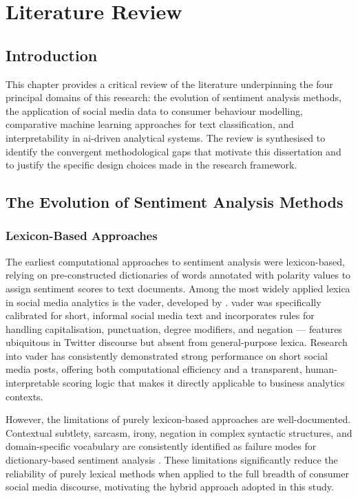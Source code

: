 \chapter{Literature Review}
\label{ch:lit}

\section{Introduction}

This chapter provides a critical review of the literature underpinning the four principal domains of this research: the evolution of sentiment analysis methods, the application of social media data to consumer behaviour modelling, comparative machine learning approaches for text classification, and interpretability in \gls{ai}-driven analytical systems. The review is synthesised to identify the convergent methodological gaps that motivate this dissertation and to justify the specific design choices made in the research framework.

\section{The Evolution of Sentiment Analysis Methods}

\subsection{Lexicon-Based Approaches}

The earliest computational approaches to sentiment analysis were lexicon-based, relying on pre-constructed dictionaries of words annotated with polarity values to assign sentiment scores to text documents. Among the most widely applied lexica in social media analytics is the \gls{vader}, developed by \citet{hutto2014vader}. \gls{vader} was specifically calibrated for short, informal social media text and incorporates rules for handling capitalisation, punctuation, degree modifiers, and negation --- features ubiquitous in Twitter discourse but absent from general-purpose lexica. Research into \gls{vader} has consistently demonstrated strong performance on short social media posts, offering both computational efficiency and a transparent, human-interpretable scoring logic that makes it directly applicable to business analytics contexts.

However, the limitations of purely lexicon-based approaches are well-documented. Contextual subtlety, sarcasm, irony, negation in complex syntactic structures, and domain-specific vocabulary are consistently identified as failure modes for dictionary-based sentiment analysis \citep{cambria2017senticnet}. These limitations significantly reduce the reliability of purely lexical methods when applied to the full breadth of consumer social media discourse, motivating the hybrid approach adopted in this study.

